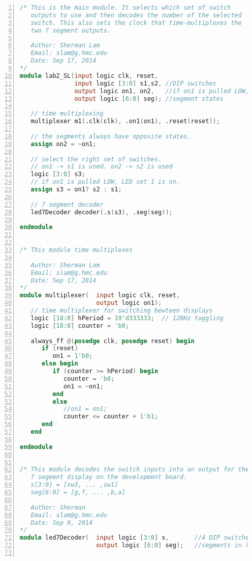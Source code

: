 \documentclass[11pt]{article}
\begin{document}
\begin{lstlisting}[language=Verilog,numbers=left,basicstyle=\footnotesize]
/* This is the main module. It selects which set of switch
   outputs to use and then decodes the number of the selected
   switch. This also sets the clock that time-multiplexes the 
   two 7 segment outputs.
   
   Author: Sherman Lam
   Email: slam@g.hmc.edu
   Date: Sep 17, 2014
*/
module lab2_SL(input logic clk, reset,
               input logic [3:0] s1,s2, //DIP switches
               output logic on1, on2,   //if on1 is pulled LOW, LED set 1 is on.
               output logic [6:0] seg); //segment states    
   
   // time multiplexing
   multiplexer m1(.clk(clk), .on1(on1), .reset(reset));
   
   // the segments always have opposite states.
   assign on2 = ~on1;      
   
   // select the right set of switches.
   // on1 -> s1 is used. on2 -> s2 is used
   logic [3:0] s3;
   // if on1 is pulled LOW, LED set 1 is on.
   assign s3 = on1? s2 : s1;  
   
   // 7 segment decoder
   led7Decoder decoder(.s(s3), .seg(seg));
   
endmodule


/* This module time multiplexes

   Author: Sherman Lam
   Email: slam@g.hmc.edu
   Date: Sep 17, 2014
*/
module multiplexer(  input logic clk, reset,
                     output logic on1);
   // time multiplexer for switching bewteen displays
   logic [18:0] hPeriod = 19'd333333;  // 120Hz toggling
   logic [18:0] counter = 'b0;
      
   always_ff @(posedge clk, posedge reset) begin
      if (reset)     
         on1 = 1'b0;
      else begin
         if (counter >= hPeriod) begin
            counter = 'b0;
            on1 = ~on1;
         end
         else
            //on1 = on1;
            counter <= counter + 1'b1;
      end
   end
   
endmodule


/* This module decodes the switch inputs into an output for the 
   7 segment display on the development board.
   s[3:0] = [sw3, ... ,sw1]
   seg[6:0] = [g,f, ... ,b,a]
   
   Author: Sherman
   Email: slam@g.hmc.edu
   Date: Sep 9, 2014
*/
module led7Decoder(  input logic [3:0] s,       //4 DIP switches
                     output logic [6:0] seg);   //segments in 7-seg display
                     

\end{lstlisting}
\end{document}
